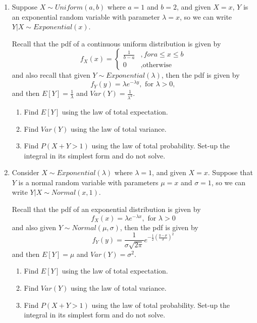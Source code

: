 \documentclass[
]{article}
\providecommand{\tightlist}{%
  \setlength{\itemsep}{0pt}\setlength{\parskip}{0pt}}
\begin{document}
\begin{enumerate}
\def\labelenumi{\arabic{enumi}.}
\item
  Suppose \(X \sim Uniform(a,b)\) where \(a = 1\) and \(b = 2\), and given \(X = x\), \(Y\) is an exponential random variable with parameter \(\lambda = x\), so we can write \(Y|X \sim Exponential(x)\).

  Recall that the pdf of a continuous uniform distribution is given by
  \[f_X(x) = 
   \begin{cases}
   \frac{1}{b-a} &, for a \le x \le b \\
   0   &, \text{otherwise}
   \end{cases}\]
  and also recall that given \(Y \sim Exponential(\lambda)\), then the pdf is given by
  \[f_Y(y) = \lambda e^{-\lambda y}, \text{ for } \lambda > 0,\]
  and then \(E[Y] = \frac{1}{\lambda}\) and \(Var(Y) = \frac{1}{\lambda^2}\).

  \begin{enumerate}
  \def\labelenumii{\alph{enumii}.}
  \tightlist
  \item
    Find \(E[Y]\) using the law of total expectation.
  \item
    Find \(Var(Y)\) using the law of total variance.
  \item
    Find \(P(X + Y > 1)\) using the law of total probability. Set-up the integral in its simplest form and do not solve.
  \end{enumerate}
\item
  Consider \(X \sim Exponential(\lambda)\) where \(\lambda = 1\), and given \(X = x\). Suppose that \(Y\) is a normal random variable with parameters \(\mu = x\) and \(\sigma = 1\), so we can write \(Y|X \sim Normal(x,1)\).

  Recall that the pdf of an exponential distribution is given by
  \[f_X(x) = \lambda e^{-\lambda x}, \text{ for } \lambda > 0\]
  and also given \(Y \sim Normal(\mu,\sigma)\), then the pdf is given by
  \[f_Y(y) = \frac{1}{\sigma \sqrt{2 \pi}} e^{-\frac{1}{2}\left( \frac{y-\mu}{\sigma} \right)^2}\]
  and then \(E[Y] = \mu\) and \(Var(Y) = \sigma^2\).

  \begin{enumerate}
  \def\labelenumii{\alph{enumii}.}
  \tightlist
  \item
    Find \(E[Y]\) using the law of total expectation.
  \item
    Find \(Var(Y)\) using the law of total variance.
  \item
    Find \(P(X + Y > 1)\) using the law of total probability. Set-up the integral in its simplest form and do not solve.
  \end{enumerate}
\end{enumerate}
\end{document}
